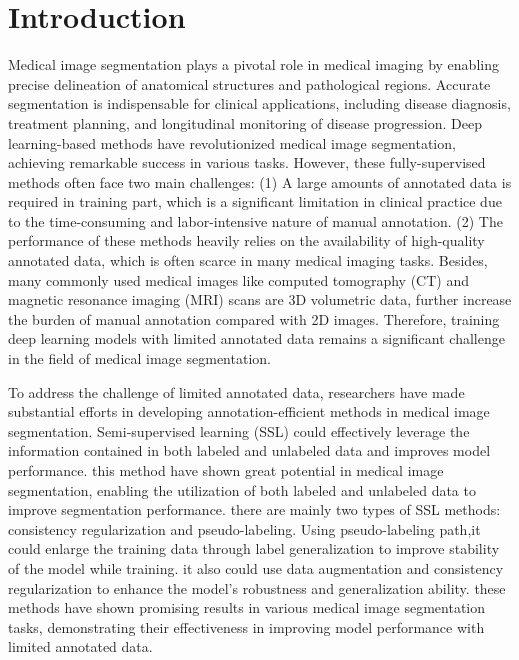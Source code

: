 \documentclass[sn-mathphys-num]{sn-jnl}
\theoremstyle{thmstyleone}%
\theoremstyle{thmstyletwo}%
\theoremstyle{thmstylethree}%
\begin{document}
\section{Introduction}\label{sec1}
Medical image segmentation plays a pivotal role in medical imaging by enabling precise delineation of anatomical structures and pathological regions.  
Accurate segmentation is indispensable for clinical applications, including disease diagnosis, treatment planning, and longitudinal monitoring of disease progression.  
Deep learning-based methods have revolutionized medical image segmentation, achieving remarkable success in various tasks.
However, these fully-supervised methods often face two main challenges:
(1) A large amounts of annotated data is required in training part, which is a significant limitation in clinical practice due to the time-consuming and labor-intensive nature of manual annotation.
(2) The performance of these methods heavily relies on the availability of high-quality annotated data, which is often scarce in many medical imaging tasks.
Besides, many commonly used medical images like computed tomography (CT) and magnetic resonance imaging (MRI) scans are 3D volumetric data, further increase the burden of manual annotation compared with 2D images.
Therefore, training deep learning models with limited annotated data remains a significant challenge in the field of medical image segmentation.

To address the challenge of limited annotated data, researchers have made substantial efforts in developing annotation-efficient methods in medical image segmentation.
Semi-supervised learning (SSL) could effectively leverage the information contained in both labeled and unlabeled data and improves model performance.
this method have shown great potential in medical image segmentation, enabling the utilization of both labeled and unlabeled data to improve segmentation performance.
there are mainly two types of SSL methods: consistency regularization and pseudo-labeling.
Using pseudo-labeling path,it could enlarge the training data through label generalization to improve stability of the model while training.
it also could use data augmentation and consistency regularization to enhance the model's robustness and generalization ability.
these methods have shown promising results in various medical image segmentation tasks, demonstrating their effectiveness in improving model performance with limited annotated data.
\end{document}
